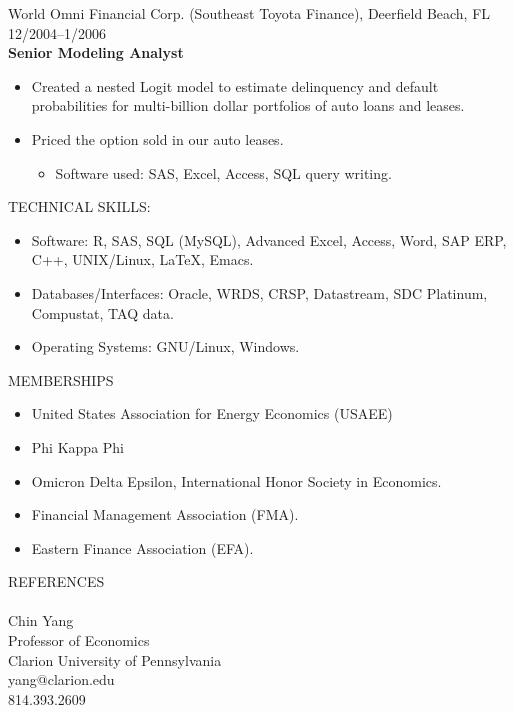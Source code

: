 \documentclass[9pt]{article}
\begin{document}
\vspace{5pt}
World Omni Financial Corp. (Southeast Toyota Finance), Deerfield Beach, FL \hfill  \hfill 12/2004--1/2006\\
{\bf Senior Modeling Analyst}
\begin{itemize}[noitemsep, nolistsep]
\item Created a nested Logit model to estimate delinquency and default probabilities for multi-billion dollar portfolios of auto loans and leases.
\item Priced the option sold in our auto leases.
\begin{itemize}[noitemsep, nolistsep]
\item Software used:  SAS, Excel, Access, SQL query writing.
\end{itemize}
\end{itemize}
\vspace{10pt}
TECHNICAL SKILLS:
\begin{itemize}[noitemsep, nolistsep]
\item Software: R, SAS, SQL (MySQL), Advanced Excel, Access, Word, SAP ERP, C++, UNIX/Linux, \LaTeX, Emacs. 
\item Databases/Interfaces: Oracle, WRDS, CRSP, Datastream, SDC Platinum, Compustat, TAQ data.
\item Operating Systems: GNU/Linux, Windows.
\end{itemize}
\vspace{10pt}
MEMBERSHIPS
\begin{itemize}[noitemsep, nolistsep]
\item United States Association for Energy Economics (USAEE)
\item Phi Kappa Phi
\item Omicron Delta Epsilon, International Honor Society in Economics.
\item Financial Management Association (FMA).
\item Eastern Finance Association (EFA).
\end{itemize}
\vspace{15pt}
\noindent REFERENCES \\
\\
Chin Yang \\
Professor of Economics \\
Clarion University of Pennsylvania \\
yang@clarion.edu \\
814.393.2609 \\
\\
\end{document}
